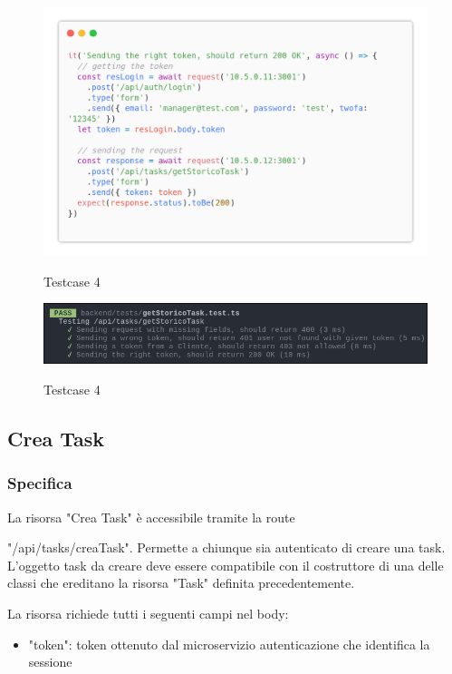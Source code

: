 \documentclass{report}
\begin{document}
\begin{figure}[H]
	\centering\includegraphics[width=1\textwidth]{images/code_storico_test4.png}

	Testcase 4
\end{figure}

\begin{figure}[H]
	\centering\includegraphics[width=1\textwidth]{images/jest_storico.png}

	Testcase 4
\end{figure}


\subsection{Crea Task}
\subsubsection*{Specifica}

La risorsa "Crea Task" è accessibile tramite la route

"/api/tasks/creaTask". Permette a chiunque sia autenticato di creare una task. L'oggetto task da creare deve essere compatibile con il costruttore di una delle classi che ereditano la risorsa "Task" definita precedentemente.

La risorsa richiede tutti i seguenti campi nel body:
\begin{itemize}
	\item "token": token ottenuto dal microservizio autenticazione che identifica la sessione
\end{itemize}
\end{document}
